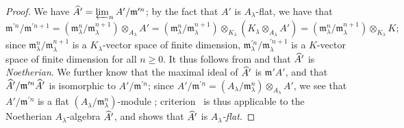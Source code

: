 \begin{proof}
We have ${\widehat{A}}'=\varprojlim_n A'/\mathfrak{m}^{\prime n}$;
by the fact that $A'$ is $A_\lambda$-flat, we have that
\[
  \mathfrak{m}^{\prime n}/\mathfrak{m}^{\prime n+1}=(\mathfrak{m}_\lambda^{n}/\mathfrak{m}_\lambda^{n+1})\otimes_{A_\lambda}A'=(\mathfrak{m}_\lambda^{n}/\mathfrak{m}_\lambda^{n+1})\otimes_{K_\lambda}(K_\lambda\otimes_{A_\lambda}A')=(\mathfrak{m}_\lambda^{n}/\mathfrak{m}_\lambda^{n+1})\otimes_{K_\lambda}K;
\]
since $\mathfrak{m}_\lambda^{n}/\mathfrak{m}_\lambda^{n+1}$ is a $K_\lambda$-vector space of finite dimension, $\mathfrak{m}_\lambda^{\prime n}/\mathfrak{m}_\lambda^{\prime n+1}$ is a $K$-vector space of finite dimension for all $n\geq 0$.
It thus follows from  and  that ${\widehat{A}}'$ is \emph{Noetherian}.
We further know that the maximal ideal of ${\widehat{A}}'$ is $\mathfrak{m}'A'$, and that ${\widehat{A}}'/\mathfrak{m}^{\prime n}{\widehat{A}}'$ is isomorphic to $A'/\mathfrak{m}^{\prime n}$;
since $A'/\mathfrak{m}^{\prime n}=(A_\lambda/\mathfrak{m}_\lambda^n)\otimes_{A_\lambda}A'$, we see that $A'/\mathfrak{m}^{\prime n}$ is a flat $(A_\lambda/\mathfrak{m}_\lambda^n)$-module ;
criterion~ is thus applicable to the Noetherian $A_\lambda$-algebra ${\widehat{A}}'$, and shows that ${\widehat{A}}'$ is \emph{$A_\lambda$-flat}.
\end{proof}

